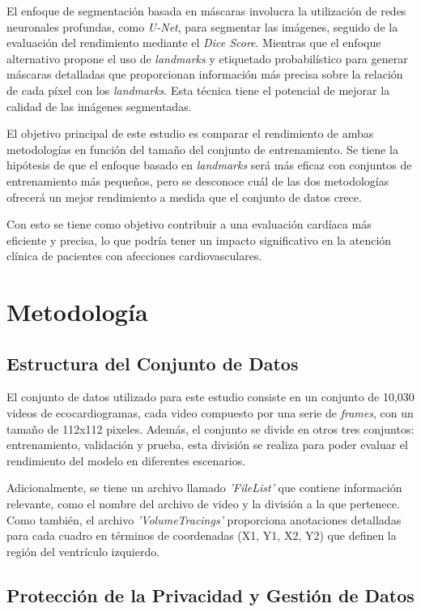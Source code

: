 \documentclass[runningheads]{llncs}
\begin{document}
El enfoque de segmentación basada en máscaras involucra la utilización de redes neuronales profundas, como \textit{U-Net}, para segmentar las imágenes, seguido de la evaluación del rendimiento mediante el \textit{Dice Score}. Mientras que el enfoque alternativo propone el uso de \textit{landmarks} y etiquetado probabilístico para generar máscaras detalladas que proporcionan información más precisa sobre la relación de cada píxel con los \textit{landmarks}. Esta técnica tiene el potencial de mejorar la calidad de las imágenes segmentadas.

El objetivo principal de este estudio es comparar el rendimiento de ambas metodologías en función del tamaño del conjunto de entrenamiento. Se tiene la hipótesis de que el enfoque basado en \textit{landmarks} será más eficaz con conjuntos de entrenamiento más pequeños, pero se desconoce cuál de las dos metodologías ofrecerá un mejor rendimiento a medida que el conjunto de datos crece.

Con esto se tiene como objetivo contribuir a una evaluación cardíaca más eficiente y precisa, lo que podría tener un impacto significativo en la atención clínica de pacientes con afecciones cardiovasculares.

\section{Metodología}
\subsection{Estructura del Conjunto de Datos}
El conjunto de datos utilizado para este estudio consiste en un conjunto de 10,030 videos de ecocardiogramas, cada video compuesto por una serie de \textit{frames}, con un tamaño de 112x112 pixeles. Además, el conjunto se divide en otros tres conjuntos: entrenamiento, validación y prueba, esta división se realiza para poder evaluar el rendimiento del modelo en diferentes escenarios.

Adicionalmente, se tiene un archivo llamado \textit{'FileList'} que contiene información relevante, como el nombre del archivo de video y la división a la que pertenece. Como también, el archivo \textit{'VolumeTracings'} proporciona anotaciones detalladas para cada cuadro en términos de coordenadas (X1, Y1, X2, Y2) que definen la región del ventrículo izquierdo.

\subsection{Protección de la Privacidad y Gestión de Datos}
\end{document}
